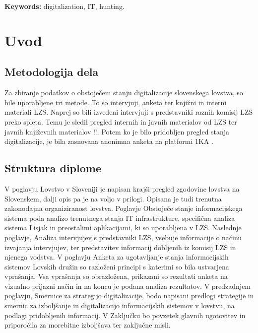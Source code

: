 \documentclass[a4paper,12pt,openright]{book}
\newcommand{\tkeywordsEn}{digitalization, IT, hunting}
\newcommand{\clearemptydoublepage}{\newpage{\pagestyle{empty}\cleardoublepage}}
\begin{document}
\noindent\textbf{Keywords:} \tkeywordsEn.
\clearemptydoublepage


\mainmatter
\setcounter{page}{1}
\pagestyle{fancy}



\chapter{Uvod}
\label{start}

\section{Metodologija dela}

Za zbiranje podatkov o obstoječem stanju digitalizacije slovenskega lovstva, so bile uporabljene tri metode.
To so intervjuji, anketa ter knjižni in interni materiali LZS.
Naprej so bili izvedeni intervjuji s predstavniki raznih komisij LZS preko spleta.
Temu je sledil pregled internih in javnih materialov od LZS ter javnih književnih materialov !!.
Potem ko je bilo pridobljen pregled stanja digitalizacije, je bila zasnovana anonimna anketa na platformi 1KA \cite{1ka}.


\section{Struktura diplome}

V poglavju Lovstvo v Sloveniji je napisan krajši pregled zgodovine lovstva na Slovenskem, dalji opis pa je na voljo v prilogi.
Opisana je tudi trenutna zakonodajna organiziranost lovstva.
Poglavje Obstoječe stanje informacijskega sistema poda analizo trenutnega stanja IT infrastrukture, specifična analiza sistema Lisjak in preostalimi aplikacijami, ki so uporabljena v LZS.
Naslednje poglavje, Analiza intervjujev s predstavniki LZS, vsebuje informacije o načinu izvajanja intervjujev, ter predstavitev informacij dobljenih iz komisij LZS in njenega vodstva.
V poglavju Anketa za ugotavljanje stanja informacijskih sistemov Lovskih družin so razloženi principi s katerimi so bila ustvarjena vprašanja. 
Vsa vprašanja so obrazložena, prikazani so rezultati anketa na vizualno prijazni način in na koncu je podana analiza rezultatov.
V predzadnjem poglavju, Smernice za strategijo digitalizacije, bodo napisani predlogi strategije in smernic za izboljšanje in digitalizacijo informacijskih sistemov v lovstvu, na podlagi pridobljenih informacij.
V Zaključku bo povzetek glavnih ugotovitev in priporočila za morebitne izboljšava ter zaključne misli.
\end{document}
